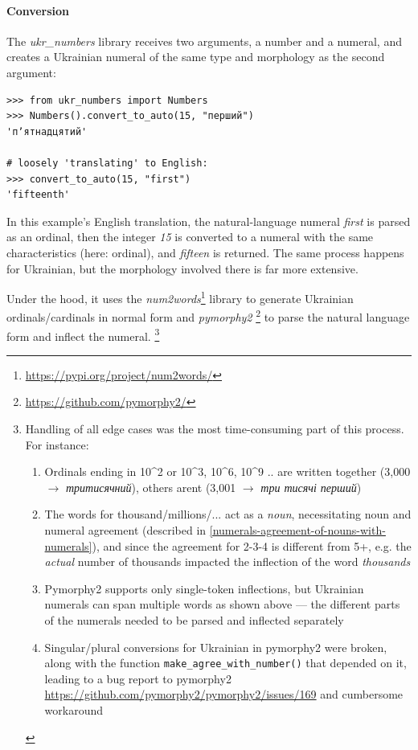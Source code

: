 \paragraph{Conversion}
The \textit{ukr\_numbers} library receives two arguments, a number and a numeral, 
and creates a Ukrainian numeral of the same type and morphology as the second argument:

\begin{verbatim}
>>> from ukr_numbers import Numbers
>>> Numbers().convert_to_auto(15, "перший")
'пʼятнадцятий'

# loosely 'translating' to English: 
>>> convert_to_auto(15, "first")
'fifteenth'
\end{verbatim}
In this example's English translation, the natural-language numeral \textit{first} is parsed as an ordinal, then the integer \textit{15} is converted to a numeral with the same characteristics (here: ordinal), and \textit{fifteen} is returned. The same process happens for Ukrainian, but the morphology involved there is far more extensive.

Under the hood, it uses the \textit{num2words}\footnote{\href{https://pypi.org/project/num2words/}{https://pypi.org/project/num2words/}} 
library to generate
Ukrainian ordinals/cardinals in normal form and \textit{pymorphy2}%
\footnote{
\href{https://github.com/pymorphy2/}{https://github.com/pymorphy2/}
}
to parse the natural
language form and inflect the numeral.%
\footnote{
Handling of all edge cases was the most time-consuming part of this process. For instance: 
\begin{enumerate}
\tightlist
    \item Ordinals ending in 10\^{}2 or 10\^{}3, 10\^{}6, 10\^{}9 .. are
    written together (3,000 $\rightarrow$ \emph{тритисячний}), others
    aren\textquotesingle t (3,001 $\rightarrow$ \emph{три тисячі
    перший})
    \item The words for thousand/millions/... act as a \textit{noun}, necessitating
    noun and numeral agreement (described in \autoref{numerals-agreement-of-nouns-with-numerals}),
    and since the agreement for 2-3-4 is different from 5+, e.g. the \textit{actual} number 
    of thousands impacted the inflection of the word \textit{thousands}
    \item  Pymorphy2 supports only single-token inflections, but Ukrainian numerals can span multiple words as shown above — the different parts of the numerals needed to be parsed and inflected separately 
    \item
      Singular/plural conversions for Ukrainian in pymorphy2 were broken,
      along with the function \texttt{make\_agree\_with\_number()} that
      depended on it, leading to a bug report to pymorphy2
      \href{https://github.com/pymorphy2/pymorphy2/issues/169}{https://github.com/pymorphy2/pymorphy2/issues/169} and cumbersome workaround
\end{enumerate}
}

